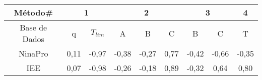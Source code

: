 \begin{table}[htb]
{
	\begin{tabular}{c|cc|ccc|cc|c}
		\toprule
		Método\# & \multicolumn{2}{c}{1} & \multicolumn{3}{c}{2} & \multicolumn{2}{c}{3} & 4\\
		\midrule
		Base de Dados	&q&$T_{lim}$&A&B&C&B&C&T \\
		\midrule \midrule					
		 NinaPro & 0,11	& -0,97 & -0,38 & -0,27  & 0,77  & -0,42 & -0,66 & -0,35\\
		 IEE	 & 	0,07& -0,98 & -0,26 & -0,18 & 0,89 & -0,32 & 0,64  & 0,80\\
		 \bottomrule
	\end{tabular}
}{}
\end{table}